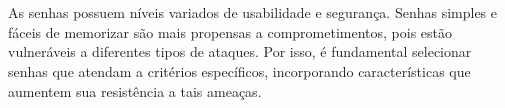 \section*{}
\vspace*{\fill}
\large{As senhas possuem níveis variados de usabilidade e segurança. Senhas simples e fáceis de memorizar são mais propensas a comprometimentos, pois estão vulneráveis a diferentes tipos de ataques. Por isso, é fundamental selecionar senhas que atendam a critérios específicos, incorporando características que aumentem sua resistência a tais ameaças.}
\vspace*{\fill}
\pagebreak
